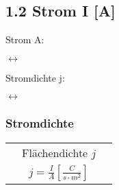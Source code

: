 \subsection*{1.2 Strom I [A]}
Strom A:

\vspace{-1mm}\begin{minipage}{0.4\linewidth}
    \begin{footnotesize}
        \begin{center}
            
        \end{center}
    \end{footnotesize}
\end{minipage}
$\longleftrightarrow$
\begin{minipage}{0.4\linewidth}
    \begin{footnotesize}
        \begin{center}
        \end{center}
    \end{footnotesize}
\end{minipage}
\vspace{1mm}

Stromdichte j:

\vspace{-1mm}\begin{minipage}{0.25\linewidth}
    \begin{footnotesize}
        \begin{center}
            
        \end{center}
    \end{footnotesize}
\end{minipage}
$\longleftrightarrow$
\begin{minipage}{0.55\linewidth}
    \begin{footnotesize}
        \begin{center}
        \end{center}
    \end{footnotesize}
\end{minipage}
\vspace{1mm}

\subsubsection{Stromdichte}
\begin{tabular}{c c c}
    & Flächendichte $j$ &\\
    & $j = \frac{I}{A} \left[\frac{C}{s \cdot m^2}\right]$ &
\end{tabular}

